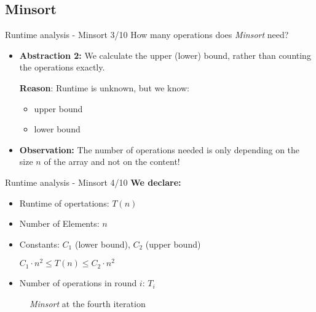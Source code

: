 
\subsection{Minsort}


\begin{frame}{Runtime analysis - Minsort 3/10}
  How many operations does \textit{Minsort} need?
  \begin{itemize}
    \item
      \textbf{Abstraction 2:} We calculate the upper (lower) bound,
      rather than counting the operations exactly.

      \textbf{Reason}: Runtime is unknown, but we know:
      \begin{itemize}
        \item {\color{Hell-Gruen}upper bound}
        \item {\color{Hell-Gruen}lower bound}
      \end{itemize}
    \item
      \textbf{Observation:} The number of operations needed is only
      depending on the size {\color{Mittel-Blau}$n$} of the array and not on the content!
  \end{itemize}
\end{frame}


\begin{frame}{Runtime analysis - Minsort 4/10}
  \textbf{We declare:}
  \begin{itemize}
    \item Runtime of opertations: $T(n)$
    \item Number of Elements: $n$
    \item Constants: $C_1$ ({\color{Hell-Gruen}lower bound}),
      $C_2$ ({\color{Hell-Gruen}upper bound})
    \begin{center}
      $C_{1} \cdot n^2
      \leq T(n)
      \leq C_{2} \cdot n^2$
    \end{center}
    \item Number of operations in round $i$: $T_i$
  \end{itemize}
  \begin{figure}[!h]
    \begin{adjustbox}{width=0.5\linewidth}
    \end{adjustbox}%
    \caption{\textit{Minsort} at the fourth iteration}%
    \label{fig:minsort_def}%
  \end{figure}
\end{frame}

